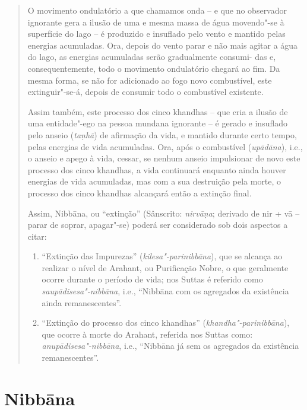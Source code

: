 \begin{quote}
  O movimento ondulatório a que chamamos onda -- e que no observador ignorante
  gera a ilusão de uma e mesma massa de água movendo"-se à superfície do lago --
  é produzido e insuflado pelo vento e mantido pelas energias acumuladas. Ora,
  depois do vento parar e não mais agitar a água do lago, as energias acumuladas
  serão gradualmente consumi- das e, consequentemente, todo o movimento
  ondulatório chegará ao fim. Da mesma forma, se não for adicionado ao fogo novo
  combustível, este extinguir"-se-á, depois de consumir todo o combustível
  existente.

  Assim também, este processo dos cinco khandhas -- que cria a ilusão de uma
  entidade"-ego na pessoa mundana ignorante -- é gerado e insuflado pelo anseio
  (\emph{ta\d{n}hā}) de afirmação da vida, e mantido durante certo tempo, pelas energias de
  vida acumuladas. Ora, após o combustível (\emph{upādāna}), i.e., o anseio e
  apego à vida, cessar, se nenhum anseio impulsionar de novo este processo dos
  cinco khandhas, a vida continuará enquanto ainda houver energias de vida
  acumuladas, mas com a sua destruição pela morte, o processo dos cinco khandhas
  alcançará então a extinção final.

  Assim, Nibbāna, ou ``extinção'' (Sânscrito: \emph{nirvā\d{n}a}; derivado de nir +
  vā -- parar de soprar, apagar"-se) poderá ser considerado sob dois aspectos a
  citar:

  \begin{enumerate}

    \item ``Extinção das Impurezas'' (\emph{kilesa"-parinibbāna}), que se
          alcança ao realizar o nível de Arahant, ou Purificação Nobre, o que
          geralmente ocorre durante o período de vida; nos Suttas é referido
          como \emph{saupādisesa"-nibbāna}, i.e., ``Nibbāna com os agregados da
          existência ainda remanescentes''.

    \item ``Extinção do processo dos cinco khandhas''
          (\emph{khandha"-parinibbāna}), que ocorre à morte do Arahant, referida
          nos Suttas como: \emph{anupādisesa"-nibbāna}, i.e., ``Nibbāna já sem os
          agregados da existência remanescentes''.

  \end{enumerate}
\end{quote}

\section{Nibbāna}

